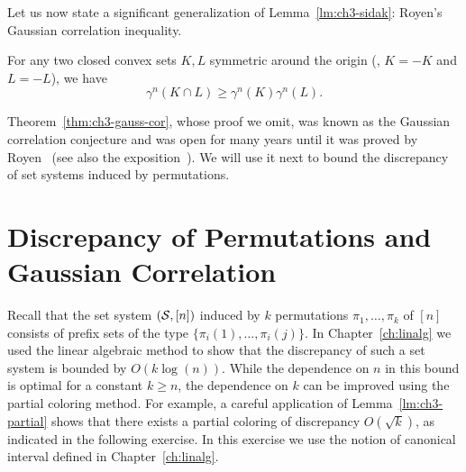 Let us now state a significant generalization
of Lemma~\ref{lm:ch3-sidak}: Royen's Gaussian correlation inequality.
\begin{theorem}\label{thm:ch3-gauss-cor}
  For any two closed convex sets \(K, L\) symmetric around the origin
  (\ie, \(K = -K\) and \(L = -L\)), we have
  \begin{equation}\label{eq:ch3-gauss-cor}
  \gamma^n(K \cap L) \ge \gamma^n(K) \gamma^n(L).
  \end{equation}
\end{theorem}
Theorem~\ref{thm:ch3-gauss-cor}, whose proof we omit, was known as the
Gaussian correlation conjecture and was open for many years until it
was proved by Royen~\cite{Royen14} (see also the
exposition~\cite{LM-royen}). We will use it next to bound the discrepancy of set systems induced by
permutations.
\section{Discrepancy of Permutations and Gaussian Correlation}\label{sect:ch3-corr}
Recall that the set system \((\mathcal{S},[n])\) induced by \(k\) permutations
\(\pi_1, \ldots, \pi_k\) of \([n]\) consists of prefix sets of the type
\(\{\pi_i(1), \ldots, \pi_i(j)\}\). In Chapter~\ref{ch:linalg} we used
the linear algebraic method to show that the discrepancy of such a set
system is bounded by \(O(k\log(n))\). While the dependence on \(n\) in
this bound is optimal for a constant \(k \ge n\), the dependence on
\(k\) can be improved using the partial coloring method. For example,
a careful application of Lemma~\ref{lm:ch3-partial} shows that there
exists a partial coloring of discrepancy \(O(\sqrt{k})\), as indicated
in the following exercise. In this exercise we use the notion of
canonical interval defined in Chapter~\ref{ch:linalg}.

